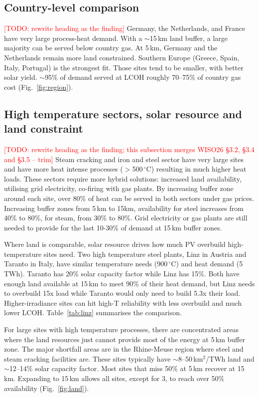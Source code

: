 \documentclass[11pt]{article}
\newcommand{\todo}[1]{\textcolor{red}{[TODO: #1]}}
\begin{document}
\subsection*{Country-level comparison}
\todo{rewrite heading as the finding}
Germany, the Netherlands, and France have very large process-heat demand. With a $\sim$15\,km land buffer, a large majority can be served below country gas. At 5\,km, Germany and the Netherlands remain more land constrained. Southern Europe (Greece, Spain, Italy, Portugal) is the strongest fit. Those sites tend to be smaller, with better solar yield. $\sim$95\% of demand served at LCOH roughly 70--75\% of country gas cost (Fig.~\ref{fig:region}).

\subsection*{High temperature sectors, solar resource and land constraint}
\todo{rewrite heading as the finding; this subsection merges WISO26 \S3.2, \S3.4 and \S3.5 -- trim}
Steam cracking and iron and steel sector have very large sites and have more heat intense processes ($>$500\,$^\circ$C) resulting in much higher heat loads. These sectors require more hybrid solutions: increased land availability, utilising grid electricity, co-firing with gas plants. By increasing buffer zone around each site, over 80\% of heat can be served in both sectors under gas prices. Increasing buffer zones from 5\,km to 15km, availability for steel increases from 40\% to 80\%, for steam, from 30\% to 80\%. Grid electricity or gas plants are still needed to provide for the last 10-30\% of demand at 15\,km buffer zones.

Where land is comparable, solar resource drives how much PV overbuild high-temperature sites need. Two high temperature steel plants, Linz in Austria and Taranto in Italy, have similar temperature needs (900\,$^\circ$C) and heat demand (5\,TWh). Taranto has 20\% solar capacity factor while Linz has 15\%. Both have enough land available at 15\,km to meet 90\% of their heat demand, but Linz needs to overbuild 15x load while Taranto would only need to build 5.3x their load. Higher-irradiance sites can hit high-T reliability with less overbuild and much lower LCOH. Table~\ref{tab:linz} summarises the comparison.

For large sites with high temperature processes, there are concentrated areas where the land resources just cannot provide most of the energy at 5\,km buffer zone. The major shortfall areas are in the Rhine-Meuse region where steel and steam cracking facilities are. These sites typically have $\sim$8--50\,km$^2$/TWh land and $\sim$12--14\% solar capacity factor. Most sites that miss 50\% at 5\,km recover at 15\,km. Expanding to 15\,km allows all sites, except for 3, to reach over 50\% availability (Fig.~\ref{fig:land}).
\end{document}
